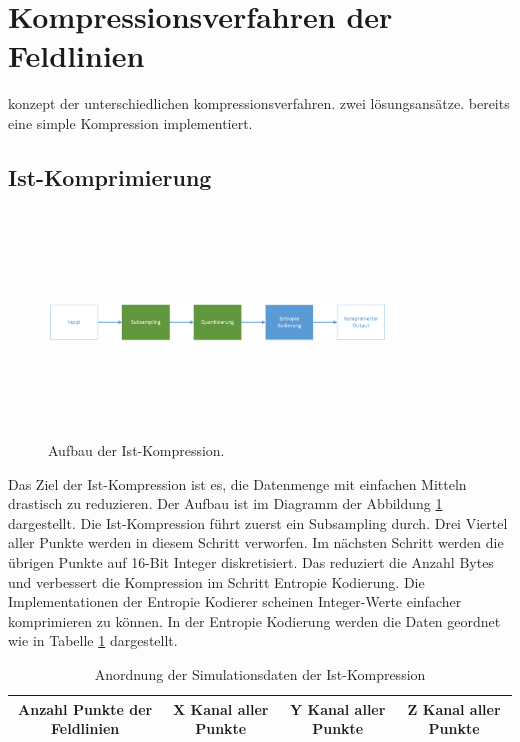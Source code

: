 \section{Kompressionsverfahren der Feldlinien} \label{konzept}
konzept der unterschiedlichen kompressionsverfahren. zwei lösungsansätze. 
bereits eine simple Kompression implementiert.

\subsection{Ist-Komprimierung} \label{konzept:ist-komprimierung}
\begin{figure}[!htbp]
	\center
	\includegraphics[width=0.8\textwidth,height=6cm,keepaspectratio]{./pictures/konzept/ist/aufbau.png}
	\caption{Aufbau der Ist-Kompression.}
	\label{konzept:ist:aufbau:diagramm}
\end{figure}
Das Ziel der Ist-Kompression ist es, die Datenmenge mit einfachen Mitteln drastisch zu reduzieren. Der Aufbau ist im Diagramm der Abbildung \ref{konzept:ist:aufbau:diagramm} dargestellt. Die Ist-Kompression führt zuerst ein Subsampling durch. Drei Viertel aller Punkte werden in diesem Schritt verworfen. Im nächsten Schritt werden die übrigen Punkte  auf 16-Bit Integer diskretisiert. Das reduziert die Anzahl Bytes und verbessert die Kompression im Schritt Entropie Kodierung. Die Implementationen der Entropie Kodierer scheinen Integer-Werte einfacher komprimieren zu können. In der Entropie Kodierung werden die Daten geordnet wie in Tabelle \ref{konzept:ist:entropie} dargestellt.
\begin{table}[!htbp]
	\center
	\begin{tabular}{|c|c|c|c|}
	\hline
	Anzahl Punkte der Feldlinien & X Kanal aller Punkte & Y Kanal aller Punkte & Z Kanal aller Punkte \\\hline
	\end{tabular}
	\caption{Anordnung der Simulationsdaten der Ist-Kompression}
	\label{konzept:ist:entropie}
\end{table}
